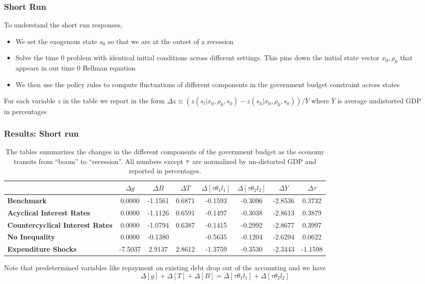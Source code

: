 \documentclass{beamer}
\begin{document}
 \begin{frame}
  \frametitle{Short Run}
  To understand the short run responses,
  \begin{itemize}
   \item   We set the exogenous state $s_0$ so  that we are at the outset of a recession
   \item Solve the time 0 problem with identical initial conditions across
different settings. This pins down the initial state vector  $x_0,\rho_0$  that appears in our time $0$ Bellman equation
\item We then use the policy rules to compute fluctuations of
different components in the government budget constraint across states
  \end{itemize}
For each variable
$z$ in the table we report in the form $\Delta z\equiv \left( z\left(
s_l|x_0,\rho_0,s_0\right) -z\left( s_h|x_0,\rho_0,s_0\right) \right) /\bar{Y}
$ where $\bar{Y}$ is average undistorted GDP in percentages
 \end{frame}


 \begin{frame}
 \frametitle{Results: Short run}
 {\tiny
\begin{table}[tbp]
\begin{tabular}{|l|c|c|c|c|c|c|c|}
\hline
& \textbf{$\Delta g$} & \textbf{$\Delta B$} & \textbf{$\Delta T$} & \textbf{$%
\Delta [\tau\theta_1l_1]$} & \textbf{$\Delta [\tau\theta_2l_2]$} & \textbf{$%
\Delta Y$} & \textbf{$\Delta \tau$} \\ \hline
\textbf{Benchmark} & 0.0000 & -1.1561 & 0.6871 & -0.1593 & -0.3096 & -2.8536
& 0.3732 \\ \hline
\textbf{Acyclical Interest Rates} & 0.0000 & -1.1126 & 0.6591 & -0.1497 &
-0.3038 & -2.8613 & 0.3879 \\ \hline
\textbf{Countercyclical Interest Rates} & 0.0000 & -1.0794 & 0.6387 & -0.1415 &
-0.2992 & -2.8677 & 0.3997 \\ \hline
\textbf{No Inequality} & 0.0000 & -0.1380 &\color{red}{\textbf{ -0.5459}} & -0.5635 & -0.1204 &
-2.6294 & 0.0622 \\ \hline
\textbf{Expenditure Shocks} & -7.5037 & 2.9137 & 2.8612 & -1.3759 & -0.3530 & -2.3443 &
-1.1598 \\ \hline

\end{tabular}%

\caption{The tables summarizes the changes in the different components of the government budget as the economy transits from ``boom'' to  ``recession''.  All numbers except $\protect\tau $ are normalized by un-distorted GDP  and reported in percentages.
}

\label{tab:ShortRunPolicyResponses}
\end{table}
}
Note that predetermined variables like repayment on existing debt drop out
of the accounting and we have
\begin{equation*}
\Delta [g]+\Delta[T]+ \Delta [B]=\Delta[\tau \theta_1 l_1]+ \Delta[\tau
\theta_2 l_2]
\end{equation*}%

 \end{frame}
\end{document}
